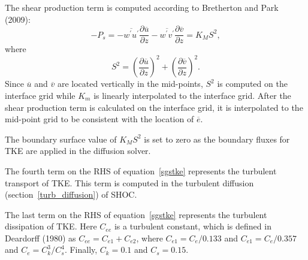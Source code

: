\documentclass[12pt,titlepage]{article}
\numberwithin{equation}{section}
\begin{document}
The shear production term is computed according to Bretherton and Park (2009):
%
\begin{equation}
  -P_{s}= -\overline{w^{'}u^{'}}\frac{\partial{\overline{u}}}{\partial{z}}-\overline{w^{'}v^{'}}\frac{\partial{\overline{v}}}{\partial{z}} = K_{M}S^{2} , 
  \label{shearprod}
\end{equation}
%
where
\begin{equation}
  S^{2} = \left(\frac{\partial{\overline{u}}}{\partial{z}}\right)^2+\left(\frac{\partial{\overline{v}}}{\partial{z}}\right)^2 . 
  \label{tke_Sterm}
\end{equation}
%
Since $\overline{u}$ and $\overline{v}$ are located vertically in the mid-points, $S^{2}$ is computed on the interface grid while $K_{m}$ is linearly interpolated to the interface grid.  After the shear production term is calculated on the interface grid, it is interpolated to the mid-point grid to be consistent with the location of $\overline{e}$. 

The boundary surface value of $K_{M}S^{2}$ is set to zero as the boundary fluxes for TKE are applied in the diffusion solver.  

The fourth term on the RHS of equation~\ref{sgstke} represents the turbulent transport of TKE.  This term is computed in the turbulent diffusion (section~\ref{turb_diffusion}) of SHOC.  

The last term on the RHS of equation~\ref{sgstke} represents the turbulent dissipation of TKE.  Here $C_{ee}$ is a turbulent constant, which is defined in Deardorff (1980) as $C_{ee}=C_{e1}+C_{e2}$, where $C_{e1} = C_{e}/0.133$ and $C_{e1} = C_{e}/0.357$ and $C_{e}=C_{k}^{3}/C_{s}^{4}$.  Finally, $C_{k} = 0.1$ and $C_{s} = 0.15$.  
\end{document}
